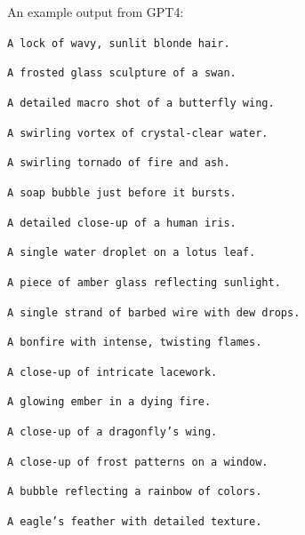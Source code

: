 An example output from GPT4:
\begin{enumerate}[noitemsep]
    {\promptExampleSize \item \texttt{A lock of wavy, sunlit blonde hair.}}
    {\promptExampleSize \item \texttt{A frosted glass sculpture of a swan.}}
    {\promptExampleSize \item \texttt{A detailed macro shot of a butterfly wing.}}
    {\promptExampleSize \item \texttt{A swirling vortex of crystal-clear water.}}
    {\promptExampleSize \item \texttt{A swirling tornado of fire and ash.}}
    {\promptExampleSize \item \texttt{A soap bubble just before it bursts.}}
    {\promptExampleSize \item \texttt{A detailed close-up of a human iris.}}
    {\promptExampleSize \item \texttt{A single water droplet on a lotus leaf.}}
    {\promptExampleSize \item \texttt{A piece of amber glass reflecting sunlight.}}
    {\promptExampleSize \item \texttt{A single strand of barbed wire with dew drops.}}
    {\promptExampleSize \item \texttt{A bonfire with intense, twisting flames.}}
    {\promptExampleSize \item \texttt{A close-up of intricate lacework.}}
    {\promptExampleSize \item \texttt{A glowing ember in a dying fire.}}
    {\promptExampleSize \item \texttt{A close-up of a dragonfly's wing.}}
    {\promptExampleSize \item \texttt{A close-up of frost patterns on a window.}}
    {\promptExampleSize \item \texttt{A bubble reflecting a rainbow of colors.}}
    {\promptExampleSize \item \texttt{A eagle's feather with detailed texture.}}

\end{enumerate}


